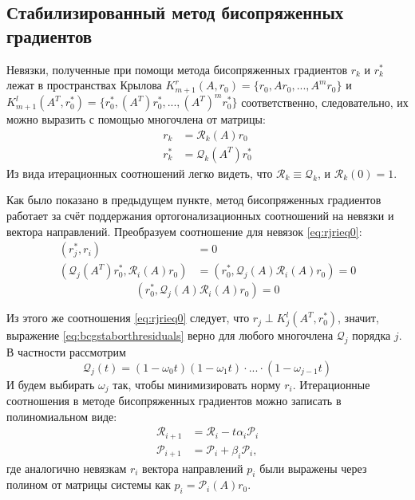 \subsection[Стабилизированный метод бисопряженных градиентов]{Стабилизированный метод бисопряженных градиентов \cite{doi:10.1137/0913035}}
Невязки, полученные при помощи метода бисопряженных градиентов $r_k$ и $r_k^*$ лежат в пространствах
Крылова $K_{m+1}^r(A, r_0) = \{r_0,A r_0, ... , A^m r_0\}$ и \\$K_{m+1}^l(A^T, r_0^*) = \{r_0^*,(A^T) r_0^*, ... , (A^T)^m r_0^*\}$ соответственно,
следовательно, их можно выразить с помощью многочлена от матрицы:
\begin{align*}
    r_k &= \mathcal{R}_k(A)r_0 \\
    r_k^* &= \mathcal{Q}_k(A^T)r_0^*
\end{align*}
Из вида итерационных соотношений легко видеть, что $\mathcal{R}_k \equiv \mathcal{Q}_k$,
 и $\mathcal{R}_k(0) = 1$. 

 \par Как было показано в предыдущем пункте, метод бисопряженных градиентов работает
 за счёт поддержания ортогонализационных соотношений на невязки и вектора направлений.
 Преобразуем соотношение для невязок \eqref{eq:rjrieq0}:
 \begin{align*}
    (r_j^*,r_i) &= 0 \\
    (\mathcal{Q}_j(A^T)r_0^*,\mathcal{R}_i(A)r_0) &= (r_0^*,\mathcal{Q}_j(A)\mathcal{R}_i(A)r_0) = 0 
 \end{align*}
 \begin{equation}
    \label{eq:bcgstaborthresiduals}
    (r_0^*,\mathcal{Q}_j(A)\mathcal{R}_i(A)r_0) = 0
 \end{equation}

Из этого же соотношения \eqref{eq:rjrieq0} следует, что $r_j \perp K^l_{j} (A^T, r_0^*)$, 
значит, выражение \eqref{eq:bcgstaborthresiduals} верно для любого многочлена $\mathcal{Q}_j$ порядка $j$.
В частности рассмотрим 
\begin{equation}
    \label{eq:bcgstabq}
    \mathcal{Q}_j(t) = (1-\omega_0 t)(1-\omega_1 t)\cdot...\cdot(1-\omega_{j-1} t)
\end{equation}
И будем выбирать $\omega_j$ так, чтобы минимизировать норму $r_i$.
Итерационные соотношения в методе бисопряженных градиентов можно записать в полиномиальном виде:
\begin{align}
    \mathcal{R}_{i+1} &= \mathcal{R}_i - t \alpha_i \mathcal{P}_i \\
    \mathcal{P}_{i+1} &= \mathcal{P}_i + \beta_i \mathcal{P}_i,
\end{align} 
где аналогично невязкам $r_i$ вектора направлений $p_i$ были выражены через 
полином от матрицы системы как $p_i = \mathcal{P}_i(A)r_0$. 

